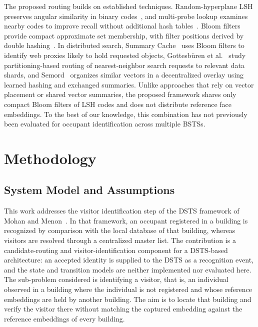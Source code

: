 \documentclass[pdflatex,sn-mathphys-num]{sn-jnl}%
\theoremstyle{thmstyleone}%
\theoremstyle{thmstyletwo}%
\theoremstyle{thmstylethree}%
\begin{document}
The proposed routing builds on established techniques. Random-hyperplane LSH preserves angular similarity in binary codes~\cite{charikar2002}, and multi-probe lookup examines nearby codes to improve recall without additional hash tables~\cite{lv2007}. Bloom filters~\cite{bloom1970} provide compact approximate set membership, with filter positions derived by double hashing~\cite{kirsch2006}. In distributed search, Summary Cache~\cite{fan2000} uses Bloom filters to identify web proxies likely to hold requested objects, Gottesb{\"u}ren et al.~\cite{gottesbueren2024} study partitioning-based routing of nearest-neighbor search requests to relevant data shards, and Semord~\cite{wang2026semord} organizes similar vectors in a decentralized overlay using learned hashing and exchanged summaries. Unlike approaches that rely on vector placement or shared vector summaries, the proposed framework shares only compact Bloom filters of LSH codes and does not distribute reference face embeddings. To the best of our knowledge, this combination has not previously been evaluated for occupant identification across multiple BSTSs.


\section{Methodology}
\label{sec:methodology}

\subsection{System Model and Assumptions}
\label{subsec:system_model}

This work addresses the visitor identification step of the DSTS framework of Mohan and Menon~\cite{mohan2020}. In that framework, an occupant registered in a building is recognized by comparison with the local database of that building, whereas visitors are resolved through a centralized master list. The contribution is a candidate-routing and visitor-identification component for a DSTS-based architecture: an accepted identity is supplied to the DSTS as a recognition event, and the state and transition models are neither implemented nor evaluated here. The sub-problem considered is identifying a visitor, that is, an individual observed in a building where the individual is not registered and whose reference embeddings are held by another building. The aim is to locate that building and verify the visitor there without matching the captured embedding against the reference embeddings of every building.
\end{document}
